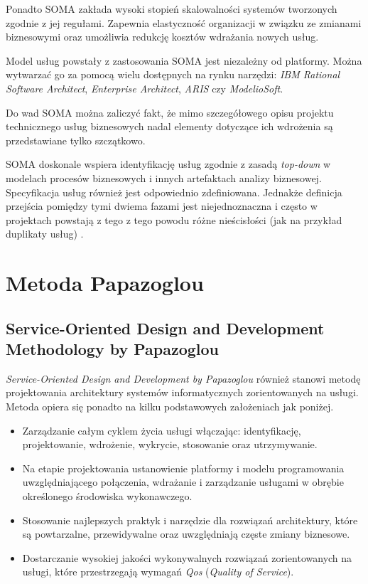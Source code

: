 Ponadto SOMA zakłada wysoki stopień skalowalności systemów tworzonych zgodnie z jej regułami. Zapewnia elastyczność organizacji w związku ze zmianami biznesowymi oraz umożliwia redukcję kosztów wdrażania nowych usług.

Model usług powstały z zastosowania SOMA jest niezależny od platformy. Można wytwarzać go za pomocą wielu dostępnych na rynku narzędzi: \emph{IBM Rational Software Architect}, \emph{Enterprise Architect}, \emph{ARIS} czy \emph{ModelioSoft}.

Do wad SOMA można zaliczyć fakt, że mimo szczegółowego opisu projektu technicznego usług biznesowych nadal elementy dotyczące ich wdrożenia są przedstawiane tylko szczątkowo.

SOMA doskonale wspiera identyfikację usług zgodnie z zasadą \emph{top-down} w modelach procesów biznesowych i innych artefaktach analizy biznesowej. Specyfikacja usług również jest odpowiednio zdefiniowana. Jednakże definicja przejścia pomiędzy tymi dwiema fazami jest niejednoznaczna i często w projektach powstają z tego z tego powodu różne nieścisłości (jak na przykład duplikaty usług) \cite{MicMetZIMM}. 


\section{Metoda Papazoglou}
\subsection{Service-Oriented Design and Development Methodology by Papazoglou}
\emph{Service-Oriented Design and Development by Papazoglou} również stanowi metodę projektowania architektury systemów informatycznych zorientowanych na usługi. Metoda opiera się ponadto na kilku podstawowych założeniach jak poniżej.
\begin{itemize}
\item{Zarządzanie całym cyklem życia usługi włączając: identyfikację, projektowanie, wdrożenie, wykrycie, stosowanie oraz utrzymywanie.}
\item{Na etapie projektowania ustanowienie platformy i modelu programowania uwzględniającego połączenia, wdrażanie i zarządzanie usługami w obrębie określonego środowiska wykonawczego.}
\item{Stosowanie najlepszych praktyk i narzędzie dla rozwiązań architektury, które są powtarzalne, przewidywalne oraz uwzględniają częste zmiany biznesowe.}
\item{Dostarczanie wysokiej jakości wykonywalnych rozwiązań zorientowanych na usługi, które przestrzegają wymagań \emph{Qos} (\emph{Quality of Service})}.
\end{itemize}

